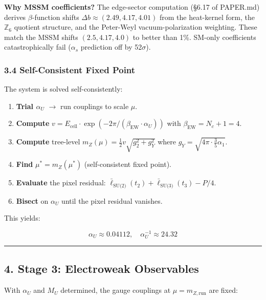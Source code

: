 \textbf{Why MSSM coefficients?} The edge-sector computation (§6.17 of PAPER.md) derives \(\beta\)-function shifts \(\Delta b \approx (2.49, 4.17, 4.01)\) from the heat-kernel form, the \(\mathbb{Z}_6\) quotient structure, and the Peter-Weyl vacuum-polarization weighting. These match the MSSM shifts \((2.5, 4.17, 4.0)\) to better than 1\%. SM-only coefficients catastrophically fail (\(\alpha_s\) prediction off by 52\(\sigma\)).

\subsubsection{3.4 Self-Consistent Fixed Point}\label{34-self-consistent-fixed-point}

The system is solved self-consistently:

\begin{enumerate}
\def\labelenumi{\arabic{enumi}.}
\tightlist
\item
  \textbf{Trial \(\alpha_U\)} \(\rightarrow\) run couplings to scale \(\mu\).
\item
  \textbf{Compute} \(v = E_{\text{cell}} \cdot \exp(-2\pi/(\beta_{\text{EW}} \cdot \alpha_U))\) with \(\beta_{\text{EW}} = N_c + 1 = 4\).
\item
  \textbf{Compute} tree-level \(m_Z(\mu) = \frac{1}{2} v \sqrt{g_2^2 + g_Y^2}\) where \(g_Y = \sqrt{4\pi \cdot \frac{3}{5}\alpha_1}\).
\item
  \textbf{Find} \(\mu^* = m_Z(\mu^*)\) (self-consistent fixed point).
\item
  \textbf{Evaluate} the pixel residual: \(\bar{\ell}_{\text{SU(2)}}(t_2) + \bar{\ell}_{\text{SU(3)}}(t_3) - P/4\).
\item
  \textbf{Bisect} on \(\alpha_U\) until the pixel residual vanishes.
\end{enumerate}

This yields:

\[\alpha_U \approx 0.04112, \quad \alpha_U^{-1} \approx 24.32\]

\begin{center}\rule{0.5\linewidth}{0.5pt}\end{center}

\subsection{4. Stage 3: Electroweak Observables}\label{4-stage-3-electroweak-observables}

With \(\alpha_U\) and \(M_U\) determined, the gauge couplings at \(\mu = m_{Z,\text{run}}\) are fixed:

